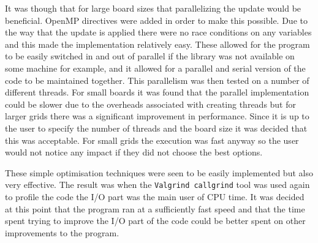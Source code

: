 It was though that for large board sizes that parallelizing the update would be beneficial.
OpenMP directives were added in order to make this possible.
Due to the way that the update is applied there were no race conditions on any variables and this made the implementation relatively easy.
These allowed for the program to be easily switched in and out of parallel if the library was not available on some machine for example, and it allowed for a parallel and serial version of the code to be maintained together.
This parallelism was then tested on a number of different threads.
For small boards it was found that the parallel implementation could be slower due to the overheads associated with creating threads but for larger grids there was a significant improvement in performance.
Since it is up to the user to specify the number of threads and the board size it was decided that this was acceptable.
For small grids the execution was fast anyway so the user would not notice any impact if they did not choose the best options.

These simple optimisation techniques were seen to be easily implemented but also very effective.
The result was when the \texttt{Valgrind callgrind} tool was used again to profile the code the I/O part was the main user of CPU time.
It was decided at this point that the program ran at a sufficiently fast speed and that the time spent trying to improve the I/O part of the code could be better spent on other improvements to the program.
